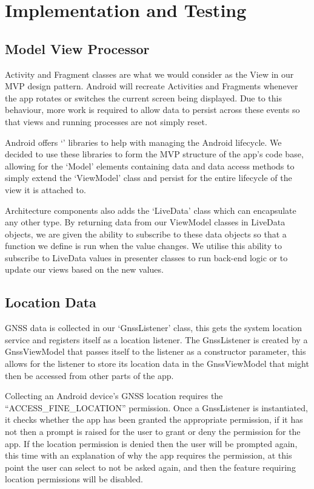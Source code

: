 \section{Implementation and Testing}\label{sec:implementation-and-testing}

\subsection{Model View Processor}\label{subsec:mvp}
Activity and Fragment classes are what we would consider as the View in our MVP design pattern.
Android will recreate Activities and Fragments whenever the app rotates or switches the current screen being displayed. Due to this behaviour, more work is required to allow data to persist across these events so that views and running processes are not simply reset.

Android offers `' libraries to help with managing the Android lifecycle.
We decided to use these libraries to form the MVP structure of the app's code base, allowing for the `Model' elements containing data and data access methods to simply extend the `ViewModel' class and persist for the entire lifecycle of the view it is attached to.

Architecture components also adds the `LiveData' class which can encapsulate any other type. By returning data from our ViewModel classes in LiveData objects, we are given the ability to subscribe to these data objects so that a function we define is run when the value changes. We utilise this ability to subscribe to LiveData values in presenter classes to run back-end logic or to update our views based on the new values.

\subsection{Location Data}\label{subsec:location-data}
GNSS data is collected in our `GnssListener' class, this gets the system location service and registers itself as a location listener. The GnssListener is created by a GnssViewModel that passes itself to the listener as a constructor parameter, this allows for the listener to store its location data in the GnssViewModel that might then be accessed from other parts of the app.

Collecting an Android device's GNSS location requires the ``ACCESS\_FINE\_LOCATION'' permission. Once a GnssListener is instantiated, it checks whether the app has been granted the appropriate permission, if it has not then a prompt is raised for the user to grant or deny the permission for the app. If the location permission is denied then the user will be prompted again, this time with an explanation of why the app requires the permission, at this point the user can select to not be asked again, and then the feature requiring location permissions will be disabled.

